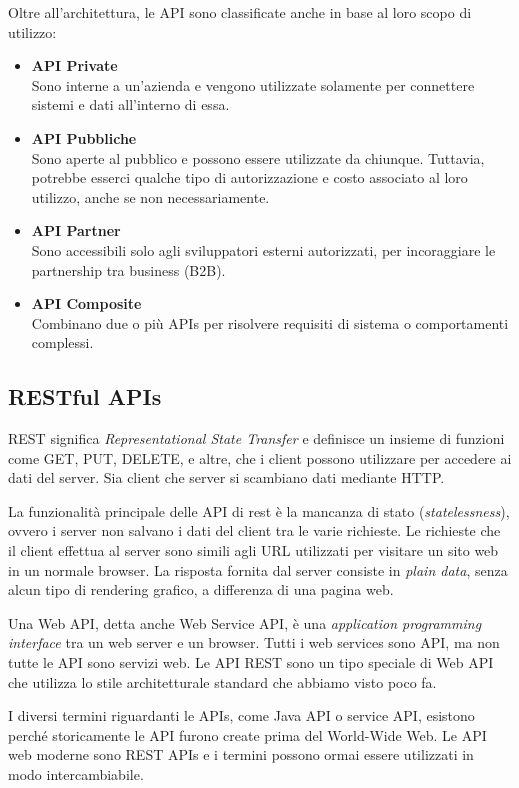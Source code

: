 Oltre all'architettura, le API sono classificate anche in base al loro scopo di utilizzo:
\begin{itemize}
    \item \textbf{API Private}\\
    Sono interne a un'azienda e vengono utilizzate solamente per connettere sistemi e dati all'interno di essa.
    \item \textbf{API Pubbliche}\\
    Sono aperte al pubblico e possono essere utilizzate da chiunque. Tuttavia, potrebbe esserci qualche tipo di autorizzazione e costo associato al loro utilizzo, anche se non necessariamente.
    \item \textbf{API Partner}\\
    Sono accessibili solo agli sviluppatori esterni autorizzati, per incoraggiare le partnership tra business (B2B).
    \item \textbf{API Composite}\\
    Combinano due o più APIs per risolvere requisiti di sistema o comportamenti complessi.
\end{itemize}

\subsection{RESTful APIs}
REST significa \textit{Representational State Transfer} e definisce un insieme di funzioni come GET, PUT, DELETE, e altre, che i client possono utilizzare per accedere ai dati del server. Sia client che server si scambiano dati mediante HTTP.

La funzionalità principale delle API di rest è la mancanza di stato (\textit{statelessness}), ovvero i server non salvano i dati del client tra le varie richieste. Le richieste che il client effettua al server sono simili agli URL utilizzati per visitare un sito web in un normale browser. La risposta fornita dal server consiste in \textit{plain data}, senza alcun tipo di rendering grafico, a differenza di una pagina web.

Una Web API, detta anche Web Service API, è una \textit{application programming interface} tra un web server e un browser. Tutti i web services sono API, ma non tutte le API sono servizi web. Le API REST sono un tipo speciale di Web API che utilizza lo stile architetturale standard che abbiamo visto poco fa.

I diversi termini riguardanti le APIs, come Java API o service API, esistono perché storicamente le API furono create prima del World-Wide Web. Le API web moderne sono REST APIs e i termini possono ormai essere utilizzati in modo intercambiabile.

